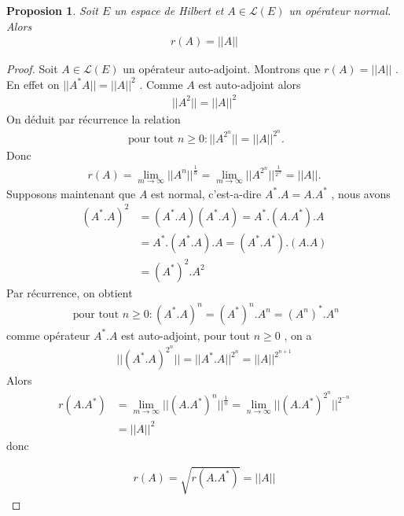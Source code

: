 \documentclass{report}
\newtheorem{Prop}{Proposion}[subsection]
\begin{document}
{\begin{Prop} Soit $E$ un espace de Hilbert et $A \in \mathscr{L}(E)$ un opérateur normal. Alors 
					\begin{align*}
								 r(A) = ||A|| 
					\end{align*}
\end{Prop}
\begin{proof}
Soit $A \in \mathscr{L}(E)$ un opérateur auto-adjoint. Montrons que $r(A) = ||A||$ . En effet on $||A^* A|| = ||A||^2$ . Comme $A$ est auto-adjoint alors 
					\begin{align*}
								 ||A^2|| = ||A||^2 
					\end{align*}
	On déduit par récurrence la relation 
					\begin{align*}
								 \,\,\text{pour tout}\,\, n \ge 0 : ||A^{2^n}|| = ||A||^{2^n} .
					\end{align*}
	Donc 
					\begin{align*}
								 r(A) = \lim_{m\to \infty} ||A^n||^{\frac{1}{n}} = \lim_{m\to \infty} ||A^{2^n}||^{\frac{1}{2^N}} = ||A|| .
					\end{align*}
Supposons maintenant que $A$ est normal, c'est-a-dire $A^*.A = A.A^*$ , nous avons 
					\begin{align*}
								 (A^*.A)^2 &= (A^*.A)(A^*.A) = A^*.(A.A^*).A \\
								 &= A^*.(A^*.A).A = (A^*.A^*).(A.A) \\
								 &= (A^*)^2.A^2 
					\end{align*}
Par récurrence, on obtient 
					\begin{align*}
								 \,\,\text{pour tout}\,\, n\ge 0 : (A^*.A)^n = (A^*)^n.A^n = (A^n)^*.A^n 
					\end{align*}
comme opérateur $A^*.A$ est auto-adjoint, pour tout $n\ge 0$ , on a 
					\begin{align*}
								 ||(A^*.A)^{2^n}|| = ||A^*.A||^{2^n} = ||A||^{2^{n+1}} 
					\end{align*}
Alors 
					\begin{align*}
								 r(A.A^*) &=  \lim_{m\to \infty} ||(A.A^*)^n||^{\frac{1}{n}} = \lim_{n\to \infty} ||(A.A^*)^{2^n}||^{2^{-n}} \\
								 &= ||A||^2 
					\end{align*}
donc 




					\begin{align*}
								 r(A) = \sqrt{r(A.A^*)} = ||A|| 
					\end{align*}
\end{proof}


}
\end{document}
